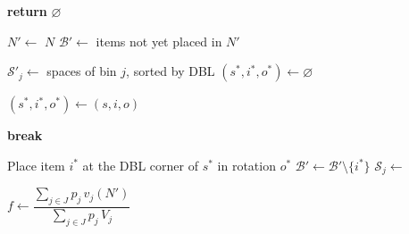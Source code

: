 \begin{algorithm}
\begin{algorithmic}[1]
    \State \textbf{return} $\varnothing$ 

\EndProcedure
\end{algorithmic}
\end{algorithm}



\begin{algorithm}
\caption{Fast constructive heuristic (\textsc{FCH})}
\label{alg:fch3d}
\small
\setlength{\baselineskip}{10pt}
\begin{algorithmic}[1]


    \State $N' \gets$ $N$
    \State $\mathcal{B}' \gets$ items not yet placed in $N'$


            \State $\mathcal{S}'_j \gets$ spaces of bin $j$, sorted by DBL
            \State $(s^\ast, i^\ast, o^\ast) \gets \varnothing$

                            \State $(s^\ast, i^\ast, o^\ast) \gets (s, i, o)$
                        \EndIf
                    \EndFor
                \EndFor
            \EndFor

                \State \textbf{break} 
            \EndIf

            \State Place item $i^\ast$ at the DBL corner of $s^\ast$
                   in rotation $o^\ast$
            \State $\mathcal{B}' \gets \mathcal{B}' \setminus \{i^\ast\}$
            \State $\mathcal{S}_j \gets$ 
        \EndWhile

    \EndFor

    \State $f \gets \dfrac{\sum_{j \in J} p_j\, v_j(N')}
                          {\sum_{j \in J} p_j\, V_j}$


\end{algorithmic}
\end{algorithm}
